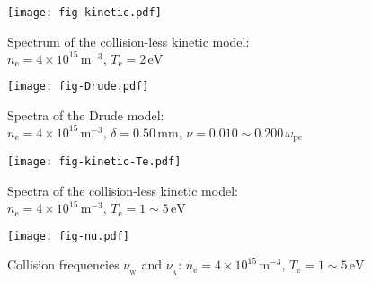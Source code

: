 \documentclass[superscriptaddress,preprint]{revtex4}  %
\begin{document}
\begin{figure}[h!]
	\centering
	\texttt{[image: fig-kinetic.pdf]} \\
	\caption{Spectrum of the collision-less kinetic model: $n_\mathrm{e}=4\times10^{15} \,\mathrm{m}^{-3},\,T_\mathrm{e}=2\,\mathrm{eV}$}
	\label{fig-kinetic}
\end{figure}

\begin{figure}[h!]
	\centering
	\texttt{[image: fig-Drude.pdf]} \\
	\caption{Spectra of the Drude model: $n_\mathrm{e}=4\times10^{15} \,\mathrm{m}^{-3},\,\delta=0.50\,\mathrm{mm},\,\nu=0.010\sim0.200\,\omega_\mathrm{pe}$}
	\label{fig-Drude}
\end{figure}
\pagebreak

\begin{figure}[h!]
	\centering
	\texttt{[image: fig-kinetic-Te.pdf]} \\
	\caption{Spectra of the collision-less kinetic model: $n_\mathrm{e}=4\times10^{15} \,\mathrm{m}^{-3},\,T_\mathrm{e}=1\sim5\,\mathrm{eV}$}
	\label{fig-kinetic-Te}
\end{figure}

\begin{figure}[h!]
	\centering
	\texttt{[image: fig-nu.pdf]} \\
	\caption{Collision frequencies $\nu_\mathrm{\!_W}$ and $\nu_\mathrm{\!_A}$: $n_\mathrm{e}=4\times10^{15} \,\mathrm{m}^{-3},\,T_\mathrm{e}=1\sim5\,\mathrm{eV}$}
	\label{fig-nu}
\end{figure}
\end{document}
